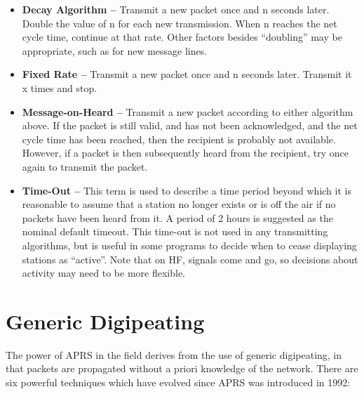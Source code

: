 \begin{itemize}


\item \textbf{Decay Algorithm --} Transmit a new packet once and n seconds later.
Double the value of n for each new transmission. When n reaches the
net cycle time, continue at that rate. Other factors besides
“doubling” may be appropriate, such as for new message lines.

\item \textbf{Fixed Rate --} Transmit a new packet once and n seconds later. Transmit
it x times and stop.

\item \textbf{Message-on-Heard --} Transmit a new packet according to either
algorithm above. If the packet is still valid, and has not been
acknowledged, and the net cycle time has been reached, then the
recipient is probably not available. However, if a packet is then
subsequently heard from the recipient, try once again to transmit the
packet.

\item \textbf{Time-Out --} This term is used to describe a time period beyond which it
is reasonable to assume that a station no longer exists or is off the air if
no packets have been heard from it. A period of 2 hours is suggested as
the nominal default timeout. This time-out is not used in any transmitting
algorithms, but is useful in some programs to decide when to cease
displaying stations as “active”. Note that on HF, signals come and go, so
decisions about activity may need to be more flexible.


\end{itemize}

\section{Generic Digipeating}


The power of APRS in the field derives from the use of generic digipeating,
in that packets are propagated without a priori knowledge of the network.
There are six powerful techniques which have evolved since APRS was
introduced in 1992:

